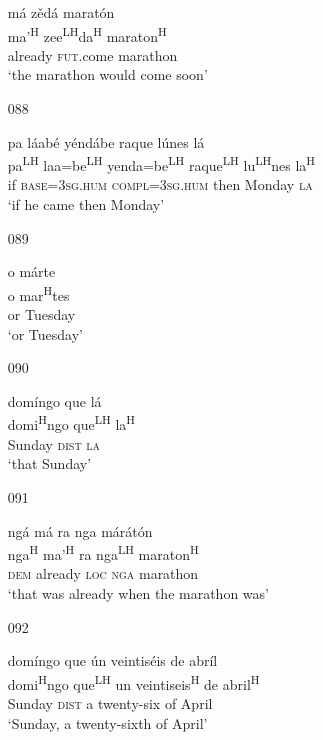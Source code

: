 \begin{itemize}
\glll   m\'{a} z\v{e}d\'{a} marat\'{o}n\\
ma'\textsuperscript{H} zee\textsuperscript{LH}da\textsuperscript{H} maraton\textsuperscript{H}\\
already \textsc{fut}.come marathon\\
\glt `the marathon would come soon'
 


\item[088]
 
\glll   pa l\'{a}ab\'{e} y\'{e}nd\'{a}be raque l\'{u}nes l\'{a}\\
pa\textsuperscript{LH} laa=be\textsuperscript{LH} yenda=be\textsuperscript{LH} raque\textsuperscript{LH} lu\textsuperscript{LH}nes la\textsuperscript{H}\\
if \textsc{base}=\textsc{3sg.hum} \textsc{compl}=\textsc{3sg.hum} then Monday \textsc{la}\\
\glt `if he came then Monday'
 


\item[089]
 
\glll   o m\'{a}rte\\
o mar\textsuperscript{H}tes\\
or Tuesday\\
\glt `or Tuesday'
 


\item[090]
 
\glll   dom\'{i}ngo que l\'{a}\\
domi\textsuperscript{H}ngo que\textsuperscript{LH} la\textsuperscript{H}\\
Sunday \textsc{dist} \textsc{la}\\
\glt `that Sunday'
 

\item[091]
 
\glll   ng\'{a} m\'{a} ra nga m\'{a}r\'{a}t\'{o}n\\
 nga\textsuperscript{H} ma'\textsuperscript{H} ra nga\textsuperscript{LH} maraton\textsuperscript{H}\\
\textsc{dem} already \textsc{loc} \textsc{nga} marathon\\
\glt `that was already when the marathon was'
 


\item[092]
 
\glll   dom\'{i}ngo que \'{u}n veintis\'{e}is de abr\'{i}l\\
domi\textsuperscript{H}ngo que\textsuperscript{LH} un veintiseis\textsuperscript{H} de abril\textsuperscript{H}\\
Sunday \textsc{dist} a twenty-six of April\\
\glt `Sunday, a twenty-sixth of April'
 


\end{itemize}
